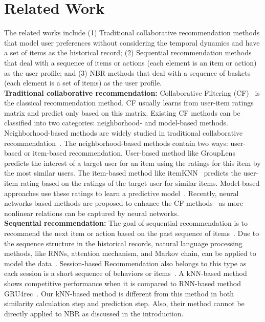 \documentclass[sigconf]{acmart}
\begin{document}
\section{Related Work}
\label{sec:related_work}
The related works include (1) Traditional collaborative recommendation 
 methods that model user preferences without considering the 
temporal dynamics and have a set of items as the historical record; 
 (2) Sequential  recommendation methods that deal with a sequence of items or actions (each  element is an item or action) as the user profile; and (3) NBR methods that deal with a sequence of baskets (each element is a set of items) as the user profile. \\
\textbf{Traditional collaborative recommendation:}  Collaborative Filtering (CF)~\cite{ricci2011introduction} is the classical recommendation method. CF usually learns from user-item ratings matrix and predict only based on this matrix. Existing CF  methods can be classified into two categories: neighborhood- and model-based methods. Neighborhood-based methods are widely studied in traditional collaborative recommendation~\cite{ning2015comprehensive}. The  neighborhood-based methods  contain two ways:  user-based or item-based
recommendation. User-based method like GroupLens~\cite{konstan1997grouplens} predicts the  interest of a target user for an item using the ratings for this item by the most similar users. The item-based method like itemKNN~\cite{deshpande2004item} predicts the user-item  rating based on the ratings of the target user for similar
items. 
Model-based approaches use these ratings to learn a predictive
model~\cite{koren2008factorization}\cite{bell2007modeling}. Recently,  neural networks-based methods are proposed to enhance the CF  methods~\cite{he2017neural}\cite{liang2018variational}\cite{he2020lightgcn} as more nonlinear relations can be captured by neural networks.\\
\textbf{Sequential  recommendation:} The goal of sequential recommendation is to recommend the next item or action based on the past sequence of items~\cite{he2016fusing}\cite{kang2018self}\cite{he2018translation}\cite{yuan2020future}. Due to the  sequence structure in the historical records, natural language processing methods, like RNNs, attention  mechanism, and Markov chain, can be applied to model the  data~\cite{he2016fusing}\cite{kang2018self}\cite{hidasi2015session}. Session-based Recommendation also belongs to this type as each session is a short  sequence of behaviors or items~\cite{ludewig2018evaluation}\cite{jannach2017recurrent}. A kNN-based method shows competitive performance when it is compared to RNN-based method GRU4rec~\cite{jannach2017recurrent}. Our kNN-based method is different from this method in both similarity calculation step and prediction step. Also, their method cannot be directly applied to  NBR as discussed in the introduction.\\
\end{document}
